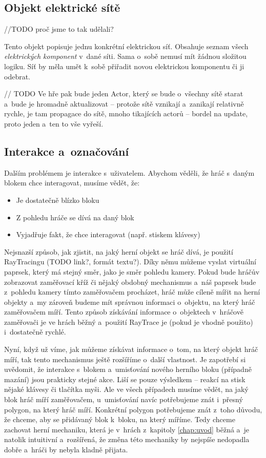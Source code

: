 \subsection{Objekt elektrické sítě}

//TODO proč jsme to tak udělali?

Tento objekt popisuje jednu konkrétní elektrickou síť. Obsahuje seznam všech \textit{elektrických komponent} v~dané síti. Sama o~sobě nemusí mít žádnou složitou logiku. Síť by měla umět k~sobě přiřadit novou elektrickou komponentu či ji odebrat. 


// TODO
Ve hře pak bude jeden Actor, který se bude o~všechny sítě starat a~bude je hromadně aktualizovat -- protože sítě vznikají a~zanikají relativně rychle, je tam propagace do sítě, mnoho tikajících actorů -- bordel na update, proto jeden a~ten to vše vyřeší.



\subsection{Interakce a~označování}

Dalším problémem je interakce s~uživatelem. Abychom věděli, že hráč s~daným blokem chce interagovat, musíme vědět, že:
\begin{itemize}
	\item Je dostatečně blízko bloku
	\item Z pohledu hráče se dívá na daný blok 
	\item Vyjadřuje fakt, že chce interagovat (např. stiskem klávesy)
\end{itemize}



Nejsnazší způsob, jak zjistit, na jaký herní objekt se hráč dívá, je použití RayTracingu (TODO link?, formát textu?). Díky němu můžeme  vyslat virtuální paprsek, který má stejný směr, jako je směr pohledu kamery. Pokud bude hráčův \HUD{} zobrazovat zaměřovací kříž či nějaký obdobný mechanismus a~náš paprsek bude z~pohledu kamery tímto zaměřovačem procházet, hráč může cíleně mířit na herní objekty a~my zároveň budeme mít správnou informaci o~objektu, na který hráč zaměřovačem míří. Tento způsob získávání informace o~objektech v~hráčově zaměřovači je ve hrách běžný a~použití RayTrace je (pokud je vhodně použito) i~dostatečně rychlé.

Nyní, když už víme, jak můžeme získávat informace o~tom, na který objekt hráč míří, tak tento mechanismus ještě rozšíříme o~další vlastnost. Je zapotřebí si uvědomit, že interakce s~blokem a~umisťování nového herního bloku (případně mazání) jsou prakticky stejné akce. Liší se pouze výsledkem -- reakcí na stisk nějaké klávesy či tlačítka myši. Ale ve všech případech musíme vědět, na jaký blok hráč míří zaměřovačem, u~umisťování navíc potřebujeme znát i~přesný polygon, na který hráč míří. Konkrétní polygon potřebujeme znát z~toho důvodu, že chceme, aby se přidávaný blok  k~bloku, na který míříme. Tedy chceme zachovat herní mechaniku, která je v~hrách z~kapitoly \ref{chap:uvod} běžná a~je natolik intuitivní a~rozšířená, že změna této mechaniky by nejspíše nedopadla dobře a~hráči by nebyla kladně přijata.

